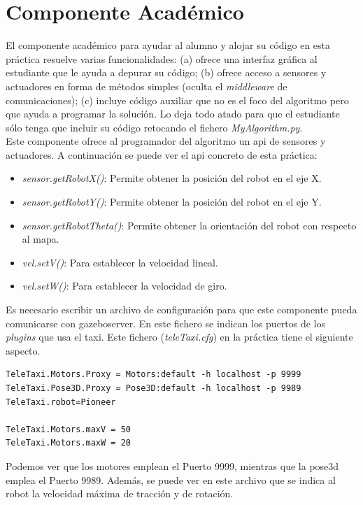 \section{Componente Académico}
El componente académico para ayudar al alumno y alojar su código en esta práctica resuelve varias funcionalidades: (a) ofrece una interfaz gráfica al estudiante que le ayuda a depurar su código; (b) ofrece acceso a sensores y actuadores en forma de métodos simples (oculta el \textit{middleware} de comunicaciones); (c) incluye código auxiliar que no es el foco del algoritmo pero que ayuda a programar la solución. Lo deja todo atado para que el estudiante sólo tenga que incluir su código retocando el fichero \textit{MyAlgorithm.py}.\\

Este componente ofrece al programador del algoritmo un \acrfull{api} de sensores y actuadores. A continuación se puede ver el \acrshort{api} concreto de esta práctica:

\begin{itemize}
\item \textit{sensor.getRobotX()}: Permite obtener la posición del robot en el eje X.
\item \textit{sensor.getRobotY()}: Permite obtener la posición del robot en el eje Y.
\item \textit{sensor.getRobotTheta()}: Permite obtener la orientación del robot con respecto al mapa.
\item \textit{vel.setV()}: Para establecer la velocidad lineal.
\item \textit{vel.setW()}: Para establecer la velocidad de giro.
\end{itemize}

Es necesario escribir un archivo de configuración para que este componente pueda comunicarse con gazeboserver. En este fichero se indican los puertos de los \textit{plugins} que usa el taxi. Este fichero (\textit{teleTaxi.cfg}) en la práctica tiene el siguiente aspecto.

\vspace{20pt}
	\begin{lstlisting}[frame=single]
TeleTaxi.Motors.Proxy = Motors:default -h localhost -p 9999
TeleTaxi.Pose3D.Proxy = Pose3D:default -h localhost -p 9989
TeleTaxi.robot=Pioneer

TeleTaxi.Motors.maxV = 50
TeleTaxi.Motors.maxW = 20

	\end{lstlisting}

Podemos ver que los motores emplean el Puerto 9999, mientras que la pose3d emplea el Puerto 9989. Además, se puede ver en este archivo que se indica al robot la velocidad máxima de tracción y de rotación.\\


